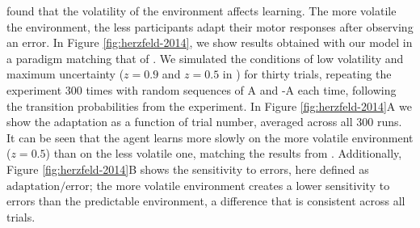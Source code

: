 \documentclass[a4paper,doc,floatsintext,natbib]{apa6}
\def \fref #1{Figure \ref{#1}}     %
\begin{document}
\cite{Herzfeld_memory_2014} found that the volatility of the environment affects learning. The more volatile the environment, the less participants adapt their motor responses after observing an error. In \fref{fig:herzfeld-2014}, we show results obtained with our model in a paradigm matching that of \cite{Herzfeld_memory_2014}. We simulated the conditions of low volatility and maximum uncertainty ($z = 0.9$ and $z = 0.5$ in \cite{Herzfeld_memory_2014}) for thirty trials, repeating the experiment 300 times with random sequences of A and -A each time, following the transition probabilities from the experiment. In \fref{fig:herzfeld-2014}A we show the adaptation as a function of trial number, averaged across all 300 runs. It can be seen that the agent learns more slowly on the more volatile environment ($z = 0.5$) than on the less volatile one, matching the results from \cite{Herzfeld_memory_2014}. Additionally, \fref{fig:herzfeld-2014}B shows the sensitivity to errors, here defined as $\text{adaptation} / \text{error}$; the more volatile environment creates a lower sensitivity to errors than the predictable environment, a difference that is consistent across all trials.
\end{document}
